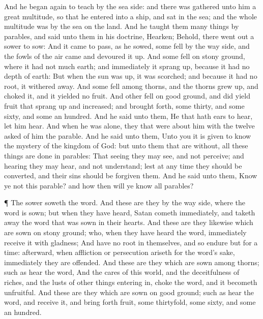  And he began again to teach by the sea side: and there was
gathered unto him a great multitude, so that he entered into a ship, and
sat in the sea; and the whole multitude was by the sea on the land.
 And he taught them many things by parables, and said unto
them in his doctrine,  Hearken; Behold, there went out a
sower to sow:  And it came to pass, as he sowed, some fell
by the way side, and the fowls of the air came and devoured it up.
 And some fell on stony ground, where it had not much earth;
and immediately it sprang up, because it had no depth of earth:
 But when the sun was up, it was scorched; and because it
had no root, it withered away.  And some fell among thorns,
and the thorns grew up, and choked it, and it yielded no fruit.
 And other fell on good ground, and did yield fruit that
sprang up and increased; and brought forth, some thirty, and some sixty,
and some an hundred.  And he said unto them, He that hath
ears to hear, let him hear.  And when he was alone, they
that were about him with the twelve asked of him the parable.
 And he said unto them, Unto you it is given to know the
mystery of the kingdom of God: but unto them that are without, all these
things are done in parables:  That seeing they may see, and
not perceive; and hearing they may hear, and not understand; lest at any
time they should be converted, and their sins should be forgiven them.
 And he said unto them, Know ye not this parable? and how
then will ye know all parables?

 ¶ The sower soweth the word.  And these are
they by the way side, where the word is sown; but when they have heard,
Satan cometh immediately, and taketh away the word that was sown in
their hearts.  And these are they likewise which are sown
on stony ground; who, when they have heard the word, immediately receive
it with gladness;  And have no root in themselves, and so
endure but for a time: afterward, when affliction or persecution ariseth
for the word's sake, immediately they are offended.  And
these are they which are sown among thorns; such as hear the word,
 And the cares of this world, and the deceitfulness of
riches, and the lusts of other things entering in, choke the word, and
it becometh unfruitful.  And these are they which are sown
on good ground; such as hear the word, and receive it, and bring forth
fruit, some thirtyfold, some sixty, and some an hundred.

